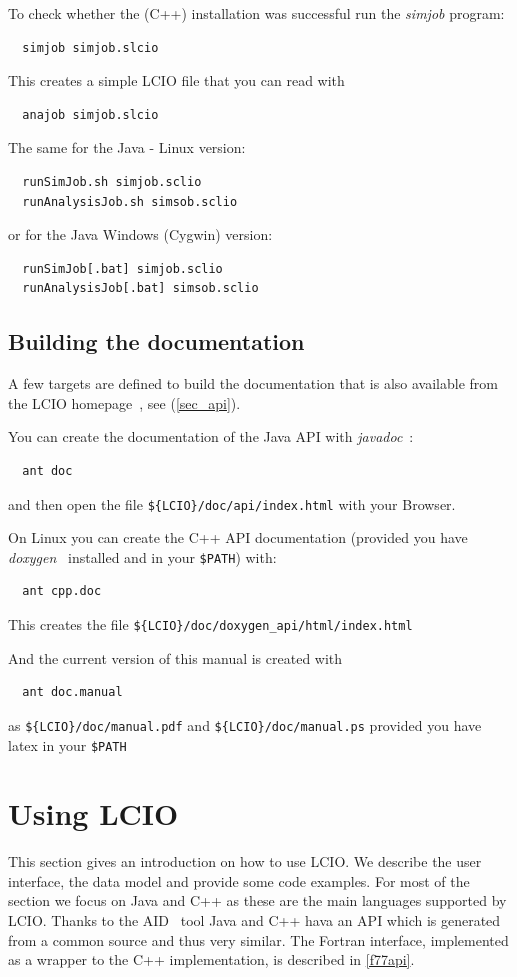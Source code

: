 \documentclass[twoside]{article}
\begin{document}
To check whether the (C++) installation was successful run the {\it simjob} program:
\begin{verbatim}
  simjob simjob.slcio
\end{verbatim}
This creates a simple LCIO file that you can read with 
\begin{verbatim}
  anajob simjob.slcio
\end{verbatim}
The same for the Java - Linux version:
\begin{verbatim}
  runSimJob.sh simjob.sclio
  runAnalysisJob.sh simsob.sclio
\end{verbatim}
or for the Java Windows (Cygwin) version:
\begin{verbatim}
  runSimJob[.bat] simjob.sclio
  runAnalysisJob[.bat] simsob.sclio
\end{verbatim}

\subsection {Building the documentation} \label{build_doc}

A few targets are defined to build the documentation that is also available from the 
LCIO homepage~\cite{lcio_home}, see (\ref{sec_api}).

You can create the documentation of the Java API with {\em javadoc}~\cite{ref_javadoc}:
\begin{verbatim}
  ant doc 
\end{verbatim}
and then open the file \verb|${LCIO}/doc/api/index.html| with your Browser. %

\vspace{\baselineskip}
On Linux you can create the C++ API documentation (provided you have {\em doxygen}~\cite{ref_doxygen} 
installed and in your \verb|$PATH|) %
with:
\begin{verbatim}
  ant cpp.doc      
\end{verbatim}
This creates the file \verb|${LCIO}/doc/doxygen_api/html/index.html|   %

\vspace{\baselineskip}
And the current version of this manual is created with
\begin{verbatim}
  ant doc.manual
\end{verbatim}
as \verb|${LCIO}/doc/manual.pdf| and \verb|${LCIO}/doc/manual.ps| provided you have latex in your 
\verb|$PATH| %

\section{Using LCIO}
This section gives an introduction on how to use LCIO. We describe the user interface, the data model and
provide some code examples. For most of the section we focus on Java and C++ as these are the main 
languages supported by LCIO. Thanks to the AID~\cite{ref_aid} tool Java and C++ hava an API which is generated
from a common source and thus very similar.
The Fortran interface, implemented as a wrapper to the C++ implementation, is described 
in \ref{f77api}. 
\end{document}

